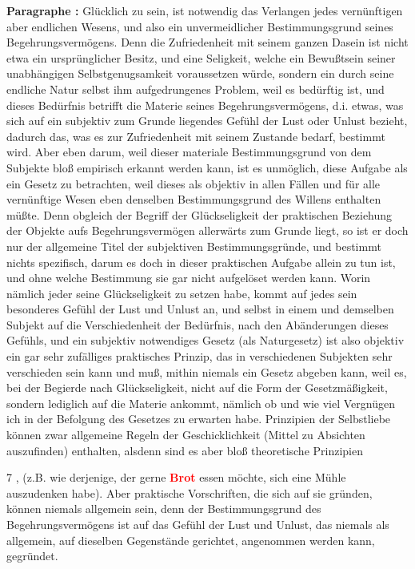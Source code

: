 \documentclass[a4paper,12pt,twoside]{book}
\newcommand{\match}[1]{\textcolor{red}{\textbf{#1}}}
\begin{document}
	\noindent\textbf{Paragraphe : }Glücklich zu sein, ist notwendig das Verlangen jedes vernünftigen aber endlichen Wesens, und also ein unvermeidlicher Bestimmungsgrund seines Begehrungsvermögens. Denn die Zufriedenheit mit seinem ganzen Dasein ist nicht etwa ein ursprünglicher Besitz, und eine Seligkeit, welche ein Bewußtsein seiner unabhängigen Selbstgenugsamkeit voraussetzen würde, sondern ein durch seine endliche Natur selbst ihm aufgedrungenes Problem, weil es bedürftig ist, und dieses Bedürfnis betrifft die Materie seines Begehrungsvermögens, d.i. etwas, was sich auf ein subjektiv zum Grunde liegendes Gefühl der Lust oder Unlust bezieht, dadurch das, was es zur Zufriedenheit mit seinem Zustande bedarf, bestimmt wird. Aber eben darum, weil dieser materiale Bestimmungsgrund von dem Subjekte bloß empirisch erkannt werden kann, ist es unmöglich, diese Aufgabe als ein Gesetz zu betrachten, weil dieses als objektiv in allen Fällen und für alle vernünftige Wesen eben denselben Bestimmungsgrund des Willens enthalten müßte. Denn obgleich der Begriff der Glückseligkeit der praktischen Beziehung der Objekte aufs Begehrungsvermögen allerwärts zum Grunde liegt, so ist er doch nur der allgemeine Titel der subjektiven Bestimmungsgründe, und bestimmt nichts spezifisch, darum es doch in dieser praktischen Aufgabe allein zu tun ist, und ohne welche Bestimmung sie gar nicht aufgelöset werden kann. Worin nämlich jeder seine Glückseligkeit zu setzen habe, kommt auf jedes sein besonderes Gefühl der Lust und Unlust an, und selbst in einem und demselben Subjekt auf die Verschiedenheit der Bedürfnis, nach den Abänderungen dieses Gefühls, und ein subjektiv notwendiges Gesetz (als Naturgesetz) ist also objektiv ein gar sehr zufälliges praktisches Prinzip, das in verschiedenen Subjekten sehr verschieden sein kann und  muß, mithin niemals ein Gesetz abgeben kann, weil es, bei der Begierde nach Glückseligkeit, nicht auf die Form der Gesetzmäßigkeit, sondern lediglich auf die Materie ankommt, nämlich ob und wie viel Vergnügen ich in der Befolgung des Gesetzes zu erwarten habe. Prinzipien der Selbstliebe können zwar allgemeine Regeln der Geschicklichkeit (Mittel zu Absichten auszufinden) enthalten, alsdenn sind es aber bloß theoretische Prinzipien
	
	
	7
	, (z.B. wie derjenige, der gerne \match{Brot} essen möchte, sich eine Mühle auszudenken habe). Aber praktische Vorschriften, die sich auf sie gründen, können niemals allgemein sein, denn der Bestimmungsgrund des Begehrungsvermögens ist auf das Gefühl der Lust und Unlust, das niemals als allgemein, auf dieselben Gegenstände gerichtet, angenommen werden kann, gegründet. 
	
\end{document}
